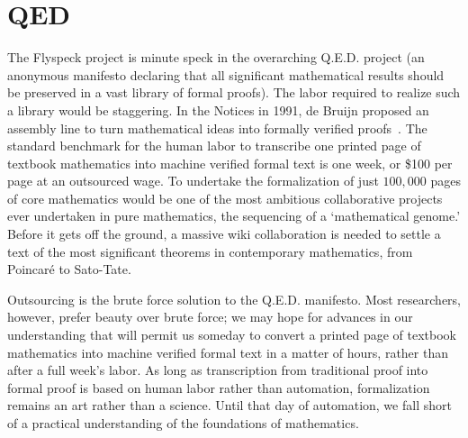 \documentclass{llncs}
\begin{document}
\section{QED}

%
%
%

The Flyspeck project is minute speck in the overarching Q.E.D. project
(an anonymous manifesto declaring that all significant mathematical results should be preserved in a vast library of formal proofs).
The labor required to realize such a library would be staggering.
In the Notices in 1991, de Bruijn proposed an assembly line
to turn mathematical ideas into formally verified proofs~\cite{dB91}.
The standard benchmark for the
human labor to transcribe one printed page
of textbook mathematics into machine verified formal text is one week, or \$100 per page at an outsourced wage. To undertake the formalization of just $100,000$ pages
of core mathematics 
would be one of the most ambitious collaborative projects ever undertaken in pure mathematics, the sequencing of a `mathematical genome.' 
Before it gets off the ground, a massive wiki collaboration is needed to
 settle  a %
text of the most significant theorems in contemporary mathematics, from 
Poincar\'e to Sato-Tate. 

Outsourcing is the brute force solution to the Q.E.D. manifesto.  Most researchers, however, prefer beauty over brute force;
we may hope for advances in our 
understanding that will permit us someday to convert a printed page of textbook mathematics into machine verified formal text in a matter of hours, rather than after a full week's labor.  As long as
transcription from traditional
proof into formal proof is based on human labor rather than
automation, formalization remains an art rather than a science.
Until that day of automation, %
we fall short of a practical understanding of the foundations of mathematics.
\end{document}
